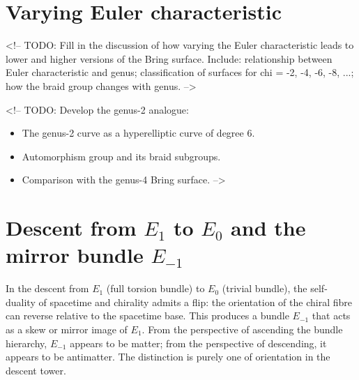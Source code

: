 \section{Varying Euler characteristic}
\label{sec:varying-euler}

<!-- TODO: Fill in the discussion of how varying the Euler characteristic
leads to lower and higher versions of the Bring surface.
Include: relationship between Euler characteristic and genus;
classification of surfaces for chi = -2, -4, -6, -8, ...;
how the braid group changes with genus. -->

<!-- TODO: Develop the genus-2 analogue:
\begin{itemize}
  \item The genus-2 curve as a hyperelliptic curve of degree 6.
  \item Automorphism group and its braid subgroups.
  \item Comparison with the genus-4 Bring surface. -->
\end{itemize}

\section{Descent from $E_1$ to $E_0$ and the mirror bundle $E_{-1}$}
\label{sec:descent-mirror}



\begin{remark}
  \label{rem:e-minus-one}
In the descent from $E_1$ (full torsion bundle) to $E_0$ (trivial
bundle), the self-duality of spacetime and chirality admits a flip: the
orientation of the chiral fibre can reverse relative to the spacetime
base.  This produces a bundle $E_{-1}$ that acts as a skew or mirror
image of $E_1$.  From the perspective of ascending the bundle hierarchy,
$E_{-1}$ appears to be matter; from the perspective of descending, it
appears to be antimatter.  The distinction is purely one of orientation
in the descent tower.
\end{remark}

